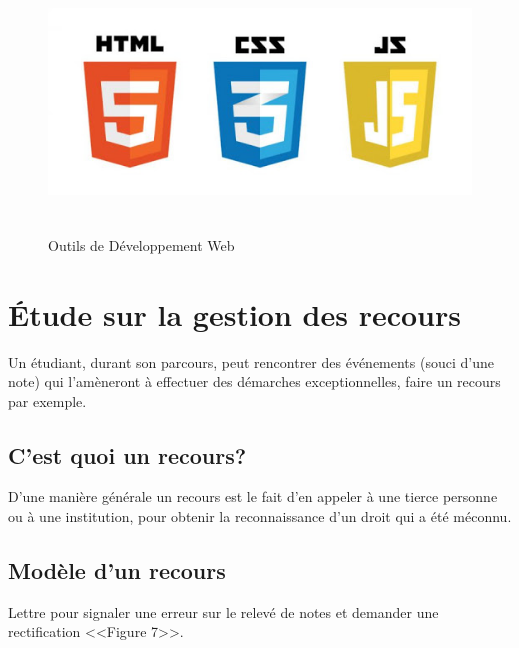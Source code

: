 \documentclass[12pt]{report}
\begin{document}
\vspace{0.2in}

\begin{figure}[h]
\centering
    \includegraphics[width = 6in, height = 2.7in]{../Images/webDevTools.jpg}
\caption{Outils de Développement Web}
\end{figure}

\newpage

\section{Étude sur la gestion des recours}
\vspace{0.2in}
Un étudiant, durant son parcours, peut rencontrer des événements (souci d’une note) qui l'amèneront à effectuer des démarches exceptionnelles, faire un recours par exemple.

\subsection{C'est quoi un recours?}
D'une manière générale un recours est le fait d'en appeler à une tierce personne ou à une institution, pour obtenir la reconnaissance d'un droit qui a été méconnu.

\subsection{Modèle d’un recours}
\vspace{0.1in}
Lettre pour signaler une erreur sur le relevé de notes et demander une rectification <<Figure 7>>.

\vspace{0.2in}
\end{document}

